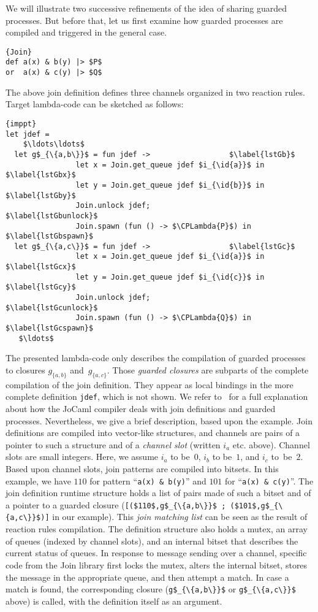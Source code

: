 \documentclass{LMCS}
\let \lst \lstinline
\newcommand{\jocaml}{\textrm{JoCaml}\xspace}
\newcommand{\id}[1]{\textit{#1}}
\renewcommand{\_}{\mathord{\rule[-.25ex]{1ex}{.15ex}}}
\newcommand{\CPLambda}[1]{\llbracket#1\rrbracket_{\lambda}}
\begin{document}
We will illustrate two successive refinements of the idea of sharing
guarded processes.  But before that, let us first examine how guarded
processes are compiled and triggered in the general case.
\begin{lstlisting}{Join}
def a(x) & b(y) |> $P$
or  a(x) & c(y) |> $Q$
\end{lstlisting}
The above join definition defines three channels organized in two
reaction rules. Target lambda-code can be sketched as follows:
\begin{lstlisting}[indent=1.8em,labelstep=1]{imppt}
let jdef =
    $\ldots\ldots$
  let g$_{\{a,b\}}$ = fun jdef ->                  $\label{lstGb}$ 
                let x = Join.get_queue jdef $i_{\id{a}}$ in $\label{lstGbx}$
                let y = Join.get_queue jdef $i_{\id{b}}$ in $\label{lstGby}$
                Join.unlock jdef;                        $\label{lstGbunlock}$
                Join.spawn (fun () -> $\CPLambda{P}$) in  $\label{lstGbspawn}$
  let g$_{\{a,c\}}$ = fun jdef ->                  $\label{lstGc}$ 
                let x = Join.get_queue jdef $i_{\id{a}}$ in $\label{lstGcx}$
                let y = Join.get_queue jdef $i_{\id{c}}$ in $\label{lstGcy}$
                Join.unlock jdef;                        $\label{lstGcunlock}$ 
                Join.spawn (fun () -> $\CPLambda{Q}$) in $\label{lstGcspawn}$
   $\ldots$
\end{lstlisting}
The presented lambda-code only describes the compilation of guarded
processes to closures $g_{\{a,b\}}$ and~$g_{\{a,c\}}$.  Those
\emph{guarded closures} are subparts of the complete compilation of
the join definition. They appear as local bindings in the more
complete definition \lst|jdef|, which is not shown.  We refer
to~\cite{LeFessantMarangetCompileJoin} for a full explanation about
how the \jocaml compiler deals with join definitions and guarded
processes.  Nevertheless, we give a brief description, based upon the
example.  Join definitions are compiled into vector-like structures,
and channels are pairs of a pointer to such a structure and of a
\emph{channel slot} (written $i_{\id{a}}$ etc. above).  Channel slots
are small integers.  Here, we assume $i_{\id{a}}$ to be~$0$,
$i_{\id{b}}$ to be~$1$, and $i_{\id{c}}$ to~be~$2$.  Based upon
channel slots, join patterns are compiled into bitsets. In this
example, we have $110$ for pattern ``\lst!a(x) & b(y)!''  and $101$
for ``\lst!a(x) & c(y)!''.  The join definition runtime structure
holds a list of pairs made of such a bitset and of a pointer to a
guarded closure (\lst|[($110$,g$_{\{a,b\}}$ ; ($101$,g$_{\{a,c\}}$)]|
in our example).  This \emph{join matching list} can be seen as the
result of reaction rules compilation.  The definition structure also
holds a mutex, an array of queues (indexed by channel slots), and an
internal bitset that describes the current status of queues.  In
response to message sending over a channel, specific code from the
\textsf{Join} library first locks the mutex, alters the internal
bitset, stores the message in the appropriate queue, and then attempt a
match.  In case a match is found, the corresponding closure
(\lst|g$_{\{a,b\}}$| or \lst|g$_{\{a,c\}}$| above) is called, with the
definition itself as an argument.
\end{document}
